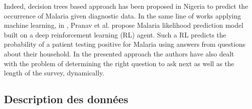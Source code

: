 Indeed, decision trees based approach has been proposed in Nigeria \cite {ugwu2012application} to predict the occurrence of Malaria given diagnostic data. In the same line of works applying machine learning, in \cite{rajpurkar2017malaria}, Pranav et al. propose Malaria likelihood prediction model built on a deep reinforcement learning (RL) agent. Such a RL predicts the probability of a patient testing positive for Malaria using answers from questions about their household. In the presented approach the authors have also dealt with the problem of determining the right question to ask next as well as the length of the survey, dynamically.
\subsection{Description des données}

